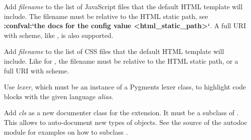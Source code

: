 \documentclass[letterpaper,10pt,english]{sphinxmanual}
\begin{document}

\begin{fulllineitems}
\label{ext/appapi:sphinx.application.Sphinx.add_javascript}
Add \emph{filename} to the list of JavaScript files that the default HTML template
will include.  The filename must be relative to the HTML static path, see
{\color{red}\bfseries{}:confval:{}`the docs for the config value \textless{}html\_static\_path\textgreater{}{}`}.  A full URI with
scheme, like , is also supported.


\end{fulllineitems}


\begin{fulllineitems}
\label{ext/appapi:sphinx.application.Sphinx.add_stylesheet}
Add \emph{filename} to the list of CSS files that the default HTML template will
include.  Like for {\hyperref[ext/appapi:sphinx.application.Sphinx.add_javascript]{}}, the filename must be relative to
the HTML static path, or a full URI with scheme.


\end{fulllineitems}


\begin{fulllineitems}
\label{ext/appapi:sphinx.application.Sphinx.add_lexer}
Use \emph{lexer}, which must be an instance of a Pygments lexer class, to
highlight code blocks with the given language \emph{alias}.


\end{fulllineitems}


\begin{fulllineitems}
\label{ext/appapi:sphinx.application.Sphinx.add_autodocumenter}
Add \emph{cls} as a new documenter class for the {\hyperref[ext/autodoc:module\string-sphinx.ext.autodoc]{}}
extension.  It must be a subclass of .
This allows to auto-document new types of objects.  See the source of the
autodoc module for examples on how to subclass .


\end{fulllineitems}
\end{document}
